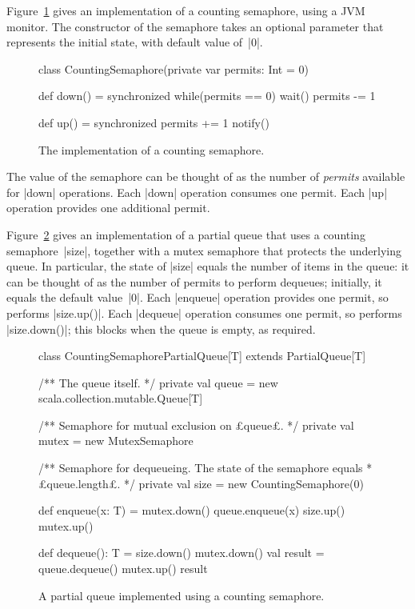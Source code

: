 Figure~\ref{fig:CountingSemaphore} gives an
implementation of a counting semaphore, using a JVM monitor.  The constructor
of the semaphore takes an optional parameter that represents the initial
state, with default value of~|0|.


\begin{figure}[htbp]
\begin{scala}
class CountingSemaphore(private var permits: Int = 0){
  def down() = synchronized{
    while(permits == 0) wait()
    permits -= 1
  }

  def up() = synchronized{
    permits += 1
    notify()
  }
}
\end{scala}
\caption{The implementation of a counting semaphore.}
\label{fig:CountingSemaphore}
\end{figure}


The value of the semaphore can be thought of as the number of
\emph{permits} available for |down| operations.  Each |down|
operation consumes one permit.  Each |up| operation provides one additional
permit.

Figure~\ref{fig:CountingSemaphorePartialQueue} gives an implementation of a
partial queue that uses a counting semaphore~|size|, together with a mutex
semaphore that protects the underlying queue.  In particular, the state of
|size| equals the number of items in the queue: it can be thought of as the
number of permits to perform dequeues; initially, it equals the default
value~|0|.  Each |enqueue| operation provides one permit, so performs
|size.up()|.  Each |dequeue| operation consumes one permit, so performs
|size.down()|; this blocks when the queue is empty, as required.


\begin{figure}
\begin{scala}
class CountingSemaphorePartialQueue[T] extends PartialQueue[T]{
  /** The queue itself. */
  private val queue = new scala.collection.mutable.Queue[T]

  /** Semaphore for mutual exclusion on £queue£. */
  private val mutex = new MutexSemaphore

  /** Semaphore for dequeueing.  The state of the semaphore equals
    * £queue.length£. */
  private val size = new CountingSemaphore(0)

  def enqueue(x: T) = {
    mutex.down()
    queue.enqueue(x)
    size.up()
    mutex.up()
  }

  def dequeue(): T = {
    size.down()
    mutex.down()
    val result = queue.dequeue()
    mutex.up()
    result
  }
}
\end{scala}
\caption{A partial queue implemented using a counting semaphore.}
\label{fig:CountingSemaphorePartialQueue}
\end{figure}


